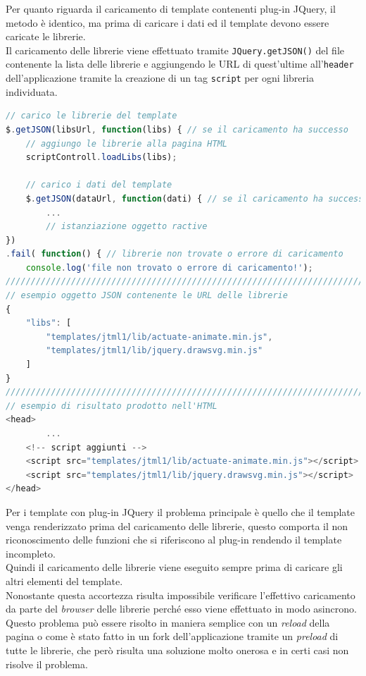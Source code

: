 Per quanto riguarda il caricamento di template contenenti plug-in JQuery, il metodo è identico, ma prima di caricare i dati ed il template devono essere caricate le librerie.\\
Il caricamento delle librerie viene effettuato tramite \texttt{JQuery.getJSON()} del file contenente la lista delle librerie e aggiungendo le URL di quest'ultime all'\texttt{header} dell'applicazione tramite la creazione di un tag \texttt{script} per ogni libreria individuata.\\
\begin{lstlisting}[language=JavaScript, caption=Codice per l'aggiunta delle librerie più esempio di JSON e risultato ottenuto.]
// carico le librerie del template
$.getJSON(libsUrl, function(libs) { // se il caricamento ha successo
	// aggiungo le librerie alla pagina HTML
	scriptControll.loadLibs(libs);

	// carico i dati del template
	$.getJSON(dataUrl, function(dati) { // se il caricamento ha successo
		...
		// istanziazione oggetto ractive
})
.fail( function() { // librerie non trovate o errore di caricamento
	console.log('file non trovato o errore di caricamento!');
///////////////////////////////////////////////////////////////////////
// esempio oggetto JSON contenente le URL delle librerie
{
	"libs": [
		"templates/jtml1/lib/actuate-animate.min.js",
		"templates/jtml1/lib/jquery.drawsvg.min.js"
	]
}
///////////////////////////////////////////////////////////////////////
// esempio di risultato prodotto nell'HTML
<head>
		...
	<!-- script aggiunti -->
	<script src="templates/jtml1/lib/actuate-animate.min.js"></script>
	<script src="templates/jtml1/lib/jquery.drawsvg.min.js"></script>
</head>

\end{lstlisting}
Per i template con plug-in JQuery il problema principale è quello che il template venga renderizzato prima del caricamento delle librerie, questo comporta il non riconoscimento delle funzioni che si riferiscono al plug-in rendendo il template incompleto.\\
Quindi il caricamento delle librerie viene eseguito sempre prima di caricare gli altri elementi del template.\\
Nonostante questa accortezza risulta impossibile verificare l'effettivo caricamento da parte del \textit{browser} delle librerie perché esso viene effettuato in modo asincrono.\\
Questo problema può essere risolto in maniera semplice con un \textit{reload} della pagina o come è stato fatto in un fork dell'applicazione tramite un \textit{preload} di tutte le librerie, che però risulta una soluzione molto onerosa e in certi casi non risolve il problema.

